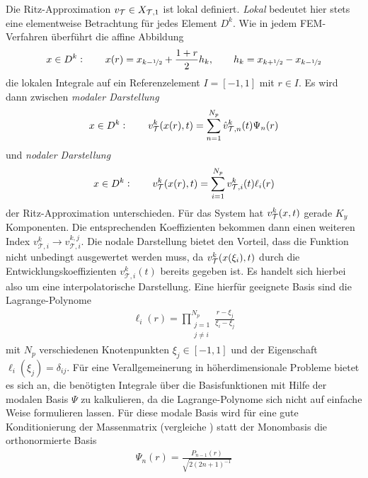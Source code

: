 Die Ritz-Approximation $v_{\mathcal{T}} \in X_{\mathcal{T},1}$ ist lokal definiert. \emph{Lokal} bedeutet hier stets eine elementweise Betrachtung für jedes Element $D^k$. Wie in jedem FEM-Verfahren überführt die affine Abbildung
\begin{equation}
  x\in D^k : \qquad x(r) = x_{k-\nicefrac{1}{2}} + \frac{1+r}{2}h_k, \qquad h_k=x_{k+\nicefrac{1}{2}} - x_{k-\nicefrac{1}{2}}
  \label{eq:affmap}
\end{equation}
die lokalen Integrale auf ein Referenzelement $I=[-1,1]$ mit $r\in I$.
Es wird dann zwischen \emph{modaler Darstellung}
\begin{align}
  x\in D^k : \qquad v_{\mathcal{T}}^k(x(r),t) = \sum_{n=1}^{N_p}\hat{v}_{\mathcal{T},n}^k(t) \Psi_n(r)
\end{align}
und \emph{nodaler Darstellung}
\begin{align}
  x\in D^k : \qquad v_{\mathcal{T}}^k(x(r),t) = \sum_{i=1}^{N_p} v_{\mathcal{T},i}^k(t)\ell_i(r)
  \label{eq:nodal}
\end{align}
der Ritz-Approximation unterschieden. Für das System hat $v_{\mathcal{T}}^k(x,t)$ gerade $K_y$ Komponenten. Die entsprechenden Koeffizienten bekommen dann einen weiteren Index $v_{\mathcal{T},i}^k \rightarrow v_{\mathcal{T},i}^{k,j}$.
Die nodale Darstellung bietet den Vorteil, dass die Funktion nicht unbedingt ausgewertet werden muss, da $v_{\mathcal{T}}^k(x(\xi_i),t)$ durch die Entwicklungskoeffizienten $v_{\mathcal{T},i}^k(t)$ bereits gegeben ist. Es handelt sich hierbei also um eine interpolatorische Darstellung.
Eine hierfür geeignete Basis sind die Lagrange-Polynome
\begin{align}
  \ell_i(r) = \prod_{\substack{j=1 \\ j\neq i}}^{N_p} \frac{r-\xi_j}{\xi_i-\xi_j}
\end{align}
mit $N_p$ verschiedenen Knotenpunkten $\xi_j\in[-1,1]$ und der Eigenschaft ${\ell_i(\xi_j)=\delta_{ij}}$. Für eine Verallgemeinerung in höherdimensionale Probleme bietet es sich an, die benötigten Integrale über die Basisfunktionen mit Hilfe der modalen Basis $\Psi$ zu kalkulieren, da die Lagrange-Polynome sich nicht auf einfache Weise formulieren lassen. Für diese modale Basis wird für eine gute Konditionierung der Massenmatrix (vergleiche ) statt der Monombasis die orthonormierte Basis
\begin{align}
  \Psi_n(r) = \frac{P_{n-1}(r)}{\sqrt{2(2n+1)^{-1}}}
  \label{eq:modaleBasis}
\end{align}
